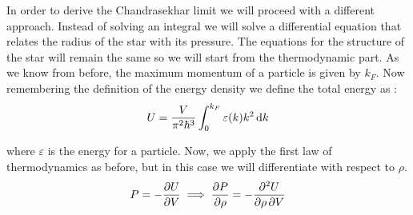 \documentclass[a4paper]{article}
\begin{document}
In order to derive the Chandrasekhar limit we will proceed with a different approach. Instead of solving an integral we will solve a differential equation that relates the radius of the star with its pressure. The equations for the structure of the star will remain the same so we will start from the thermodynamic part. As we know from before, the maximum momentum of a particle is given by $k_F$. Now remembering the definition of the energy density we define the total energy as \cite{huang}:
\begin{equation}
    U=\frac{V}{\pi^2\hbar^3}\int_{0}^{k_F}\varepsilon(k)k^2 \odif{k}
\end{equation}

\noindent where $\varepsilon$ is the energy for a particle. Now, we apply the first law of thermodynamics as before, but in this case we will differentiate with respect to $\rho$.
\begin{equation}
    P=-\pdv{U}{V} \implies \pdv{P}{\rho}=-\pdv{U}{\rho,V}
\end{equation}
\end{document}
